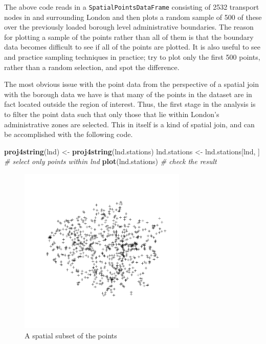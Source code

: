 \documentclass[]{article}
\newenvironment{Shaded}{}{}
\newcommand{\KeywordTok}[1]{\textcolor[rgb]{0.00,0.44,0.13}{\textbf{{#1}}}}
\newcommand{\CommentTok}[1]{\textcolor[rgb]{0.38,0.63,0.69}{\textit{{#1}}}}
\newcommand{\NormalTok}[1]{{#1}}
\let\Oldincludegraphics\includegraphics
\renewcommand{\includegraphics}[1]{\Oldincludegraphics[width=8cm]{#1}}
\begin{document}
The above code reads in a \texttt{SpatialPointsDataFrame} consisting of
2532 transport nodes in and surrounding London and then plots a random
sample of 500 of these over the previously loaded borough level
administrative boundaries. The reason for plotting a sample of the
points rather than all of them is that the boundary data becomes
difficult to see if all of the points are plotted. It is also useful to
see and practice sampling techniques in practice; try to plot only the
first 500 points, rather than a random selection, and spot the
difference.

The most obvious issue with the point data from the perspective of a
spatial join with the borough data we have is that many of the points in
the dataset are in fact located outside the region of interest. Thus,
the first stage in the analysis is to filter the point data such that
only those that lie within London's administrative zones are selected.
This in itself is a kind of spatial join, and can be accomplished with
the following code.

\begin{Shaded}
\begin{Highlighting}[]
\KeywordTok{proj4string}\NormalTok{(lnd) <- }\KeywordTok{proj4string}\NormalTok{(lnd.stations)}
\NormalTok{lnd.stations <- lnd.stations[lnd, ]  }\CommentTok{# select only points within lnd}
\KeywordTok{plot}\NormalTok{(lnd.stations)  }\CommentTok{# check the result}
\end{Highlighting}
\end{Shaded}
\begin{figure}[htbp]
\centering
\includegraphics{figure/A_spatial_subset_of_the_points.png}
\caption{A spatial subset of the points}
\end{figure}
\end{document}
